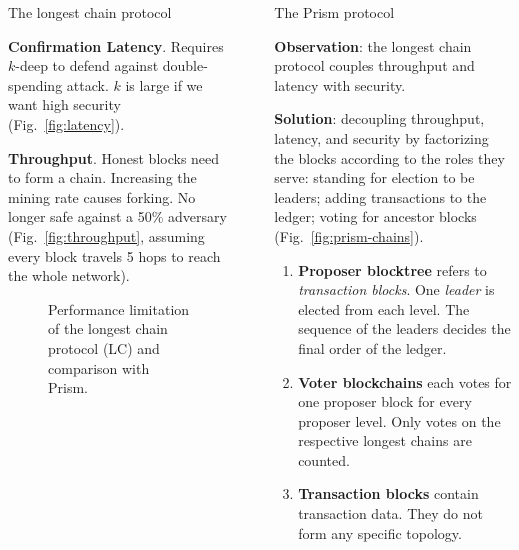 \documentclass[final]{beamer}
\newlength{\sepwidth}
\newlength{\colwidth}
\newcommand{\separatorcolumn}{\begin{column}{\sepwidth}\end{column}}
\begin{document}
\begin{frame}[t]
\begin{columns}[t]
\begin{column}{\colwidth}
\begin{block}{The longest chain protocol}
    
  \textbf{Confirmation Latency}. Requires $k$-deep to defend against double-spending attack. $k$ is large if we want high security (Fig.~\ref{fig:latency}).
  
  \textbf{Throughput}. Honest blocks need to form a chain. Increasing the mining rate causes forking. No longer safe against a 50\% adversary (Fig.~\ref{fig:throughput}, assuming every block travels 5 hops to reach the whole network).
  
  \begin{figure}
      \centering
      \caption{Performance limitation of the longest chain protocol (LC) and comparison with Prism.}
  \end{figure}
  \end{block}
  
\end{column}

\separatorcolumn

\begin{column}{\colwidth}

  
  \begin{alertblock}{The Prism protocol}

  \textbf{Observation}: the longest chain protocol couples throughput and latency with security.
  
  \textbf{Solution}: decoupling throughput, latency, and security by factorizing the blocks according to the roles they serve: standing for election to be leaders; adding transactions to the ledger; voting for ancestor blocks (Fig.~\ref{fig:prism-chains}).
  
  \begin{enumerate}
      \item \textbf{Proposer blocktree} refers to \textit{transaction blocks}. One \textit{leader} is elected from each level. The sequence of the leaders decides the final order of the ledger.
      \item \textbf{Voter blockchains} each votes for one proposer block for every proposer level. Only votes on the respective longest chains are counted.  
      \item \textbf{Transaction blocks} contain transaction data. They do not form any specific topology.
  \end{enumerate}
  

\end{alertblock}
\end{column}
\end{columns}
\end{frame}
\end{document}
